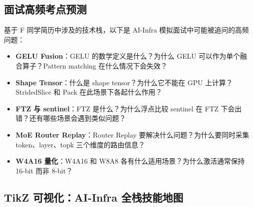 \documentclass[a4paper]{article}
\begin{document}
\subsection{面试高频考点预测}

基于 F 同学简历中涉及的技术栈，以下是 AI-Infra 模拟面试中可能被追问的高频问题：

\begin{itemize}
    \item \textbf{GELU Fusion}：GELU 的数学定义是什么？为什么 GELU 可以作为单个融合算子？Pattern matching 在什么情况下会失效？
    \item \textbf{Shape Tensor}：什么是 shape tensor？为什么它不能在 GPU 上计算？StridedSlice 和 Pack 在此场景下各起什么作用？
    \item \textbf{FTZ 与 sentinel}：FTZ 是什么？为什么浮点比较 sentinel 在 FTZ 下会出错？还有哪些场景会遇到类似问题？
    \item \textbf{MoE Router Replay}：Router Replay 要解决什么问题？为什么要同时采集 token、layer、topk 三个维度的路由信息？
    \item \textbf{W4A16 量化}：W4A16 和 W8A8 各有什么适用场景？为什么激活通常保持 16-bit 而非 8-bit？
\end{itemize}

\subsection{TikZ 可视化：AI-Infra 全栈技能地图}
\end{document}
